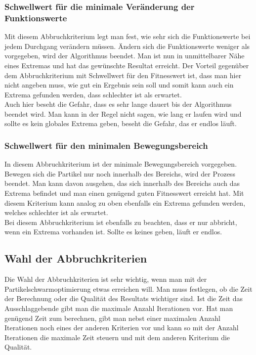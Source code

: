 \subsubsection{Schwellwert für die minimale Veränderung der Funktionswerte}
Mit diesem Abbruchkriterium legt man fest, wie sehr sich die Funktionswerte bei jedem Durchgang verändern müssen. Ändern sich die Funktionswerte weniger als vorgegeben, wird der Algorithmus beendet. Man ist nun in unmittelbarer Nähe eines Extremas und hat das gewünschte Resultat erreicht. Der Vorteil gegenüber dem Abbruchkriterium mit Schwellwert für den Fitnesswert ist, dass man hier nicht angeben muss, wie gut ein Ergebnis sein soll und somit kann auch ein Extrema gefunden werden, dass schlechter ist als erwartet. \\ 
Auch hier beseht die Gefahr, dass es sehr lange dauert bis der Algorithmus beendet wird. Man kann in der Regel nicht sagen, wie lang er laufen wird und sollte es kein globales Extrema geben, beseht die Gefahr, das er endlos läuft. 

\subsubsection{Schwellwert für den minimalen Bewegungsbereich}
In diesem Abbruchkriterium ist der minimale Bewegungsbereich vorgegeben. Bewegen sich die Partikel nur noch innerhalb des Bereichs, wird der Prozess beendet. Man kann davon ausgehen, das sich innerhalb des Bereichs auch das Extrema befindet und man einen genügend guten Fitnesswert erreicht hat. Mit diesem Kriterium kann analog zu oben ebenfalls ein Extrema gefunden werden, welches schlechter ist als erwartet.\\
Bei diesem Abbruchkriterium ist ebenfalls zu beachten, dass er nur abbricht, wenn ein Extrema vorhanden ist. Sollte es keines geben, läuft er endlos.

\subsection{Wahl der Abbruchkriterien}
Die Wahl der Abbruchkriterien ist sehr wichtig, wenn man mit der Partikelschwarmoptimierung etwas erreichen will. Man muss festlegen, ob die Zeit der Berechnung oder die Qualität des Resultats wichtiger sind. Ist die Zeit das Ausschlaggebende gibt man die maximale Anzahl Iterationen vor. Hat man genügend Zeit zum berechnen, gibt man nebst einer maximalen Anzahl Iterationen noch eines der anderen Kriterien vor und kann so mit der Anzahl Iterationen die maximale Zeit steuern und mit dem anderen Kriterium die Qualität. 

